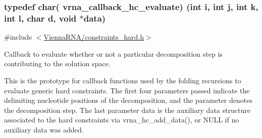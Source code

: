 \subsubsection[{vrna\+\_\+callback\+\_\+hc\+\_\+evaluate}]{\setlength{\rightskip}{0pt plus 5cm}typedef char( vrna\+\_\+callback\+\_\+hc\+\_\+evaluate) (int i, int j, int k, int l, char d, void $\ast$data)}\label{group__hard__constraints_ga16eb71ac9a7a35369be2eaa9d8f8dfa0}


{\ttfamily \#include $<$\hyperlink{constraints__hard_8h}{Vienna\+R\+N\+A/constraints\+\_\+hard.\+h}$>$}



Callback to evaluate whether or not a particular decomposition step is contributing to the solution space. 

This is the prototype for callback functions used by the folding recursions to evaluate generic hard constraints. The first four parameters passed indicate the delimiting nucleotide positions of the decomposition, and the parameter {\ttfamily denotes} the decomposition step. The last parameter {\ttfamily data} is the auxiliary data structure associated to the hard constraints via vrna\+\_\+hc\+\_\+add\+\_\+data(), or N\+U\+L\+L if no auxiliary data was added.

